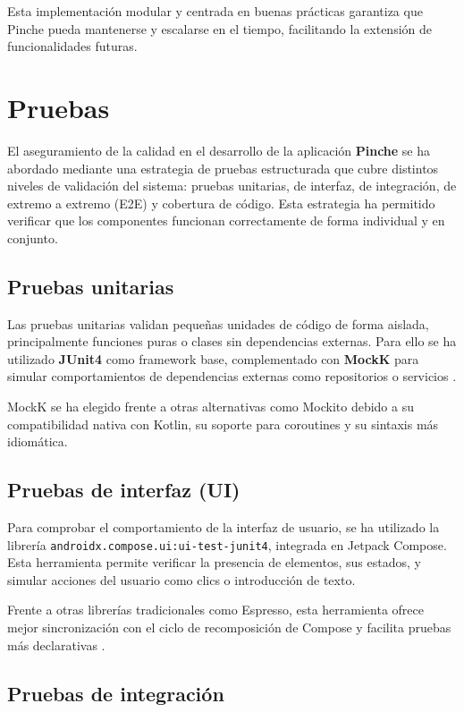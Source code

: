 Esta implementación modular y centrada en buenas prácticas garantiza que Pinche pueda mantenerse y escalarse en el tiempo, facilitando la extensi\'on de funcionalidades futuras.

\section{Pruebas}
\label{sec:pruebas}

El aseguramiento de la calidad en el desarrollo de la aplicación \textbf{Pinche} se ha abordado mediante una estrategia de pruebas estructurada que cubre distintos niveles de validación del sistema: pruebas unitarias, de interfaz, de integración, de extremo a extremo (E2E) y cobertura de código. Esta estrategia ha permitido verificar que los componentes funcionan correctamente de forma individual y en conjunto.

\subsection{Pruebas unitarias}

Las pruebas unitarias validan pequeñas unidades de código de forma aislada, principalmente funciones puras o clases sin dependencias externas. Para ello se ha utilizado \textbf{JUnit4} como framework base, complementado con \textbf{MockK} para simular comportamientos de dependencias externas como repositorios o servicios \cite{android-testing}.

MockK se ha elegido frente a otras alternativas como Mockito debido a su compatibilidad nativa con Kotlin, su soporte para coroutines y su sintaxis más idiomática.

\subsection{Pruebas de interfaz (UI)}

Para comprobar el comportamiento de la interfaz de usuario, se ha utilizado la librería \texttt{androidx.compose.ui:ui-test-junit4}, integrada en Jetpack Compose. Esta herramienta permite verificar la presencia de elementos, sus estados, y simular acciones del usuario como clics o introducción de texto.

Frente a otras librerías tradicionales como Espresso, esta herramienta ofrece mejor sincronización con el ciclo de recomposición de Compose y facilita pruebas más declarativas \cite{android-testing}.

\subsection{Pruebas de integración}

